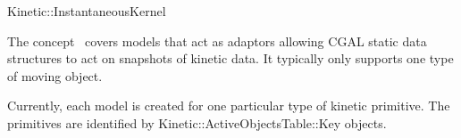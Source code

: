 

\begin{ccRefConcept}{Kinetic::InstantaneousKernel}


\ccDefinition
  
The concept \ccRefName\ covers models that act as adaptors allowing
CGAL static data structures to act on snapshots of kinetic data. It
typically only supports one type of moving object.

Currently, each model is created for one particular type of kinetic
primitive. The primitives are identified by
Kinetic::ActiveObjectsTable::Key objects.

\ccTypes 



\ccOperations




\ccHasModels






\end{ccRefConcept}


